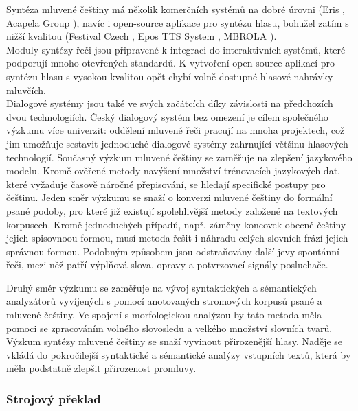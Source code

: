\begin{multicols}{2}
Syntéza mluvené češtiny má několik komerčních systémů na dobré úrovni (Eris \cite{Note11}, Acapela Group \cite{Note14}), navíc i open-source aplikace pro syntézu hlasu, bohužel zatím s nižší kvalitou (Festival Czech \cite{Note15}, Epos TTS System \cite{Note16}, MBROLA \cite{Note17}).\\
Moduly syntézy řeči jsou připravené k integraci do interaktivních systémů, které podporují mnoho otevřených standardů. K vytvoření open-source aplikací pro syntézu hlasu s vysokou kvalitou opět chybí volně dostupné hlasové nahrávky mluvčích.\\
Dialogové systémy jsou také ve svých začátcích díky závislosti na předchozích dvou technologiích. Český dialogový systém bez omezení je cílem společného výzkumu více univerzit: oddělení mluvené řeči pracují na mnoha projektech, což jim umožňuje sestavit jednoduché dialogové systémy zahrnující většinu hlasových technologií. Současný výzkum mluvené češtiny se zaměřuje na zlepšení jazykového modelu.  Kromě ověřené metody navýšení množství trénovacích jazykových dat, které vyžaduje časově náročné přepisování, se hledají specifické postupy pro češtinu. Jeden směr výzkumu se snaží o konverzi mluvené češtiny do formální psané podoby, pro které již existují spolehlivější metody založené na textových korpusech. Kromě jednoduchých případů, např. záměny koncovek obecné češtiny jejich spisovnoou formou, musí metoda řešit i náhradu celých slovních frází jejich správnou formou. Podobným způsobem jsou odstraňovány další jevy spontánní řeči, mezi něž patří výplňová slova, opravy a potvrzovací signály posluchače.

Druhý směr výzkumu se zaměřuje na vývoj syntaktických a sémantických analyzátorů vyvíjených s pomocí anotovaných stromových korpusů psané a mluvené češtiny.  Ve spojení s morfologickou analýzou by tato metoda měla pomoci se zpracováním volného slovosledu a velkého množství slovních tvarů.\\
Výzkum syntézy mluvené češtiny se snaží vyvinout přirozenější hlasy. Naděje se vkládá do pokročilejší syntaktické a sémantické analýzy vstupních textů, která by měla podstatně zlepšit přirozenost promluvy.

\subsubsection{Strojový překlad}


\end{multicols}
